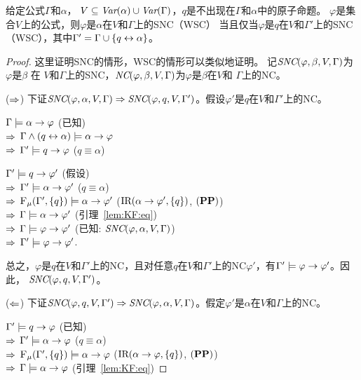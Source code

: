 \begin{proposition}\label{formulaNS_to_p}
	给定公式$\Gamma$和$\alpha$， $V \subseteq \textit{Var}(\alpha) \cup \textit{Var}(\Gamma)$，$q$是不出现在$\Gamma$和$\alpha$中的原子命题。
	$\varphi$是集合$V$上的公式，则$\varphi$是$\alpha$在$V$和$\Gamma$上的SNC（WSC） 当且仅当$\varphi$是$q$在$V$和$\Gamma'$上的SNC（WSC），其中$\Gamma' = \Gamma \cup \{q \leftrightarrow \alpha\}$。
\end{proposition}
\begin{proof}
	这里证明SNC的情形，WSC的情形可以类似地证明。
	记$\emph{SNC}(\varphi,\beta,V,\Gamma)$为$\varphi$是$\beta$ 在 $V$和$\Gamma$上的SNC，$\emph{NC}(\varphi,\beta,V,\Gamma)$为$\varphi$是$\beta$在$V$和 $\Gamma$上的NC。
	
	($\Rightarrow$) 下证$\emph{SNC}(\varphi,\alpha,V,\Gamma)\Rightarrow \emph{SNC}(\varphi,q,V,\Gamma')$。假设$\varphi'$是$q$在$V$和$\Gamma'$上的NC。
	
	$\Gamma \models \alpha \rightarrow \varphi$ \hfill  (已知)\\
	$\Rightarrow$ $\Gamma \wedge (q \leftrightarrow \alpha) \models \alpha \rightarrow \varphi$\\
	$\Rightarrow$ $\Gamma' \models q \rightarrow \varphi$  \hfill ($q \equiv \alpha$)
	
	$\Gamma' \models q \rightarrow \varphi'$ \hfill (假设) \\
	$\Rightarrow$ $\Gamma' \models \alpha \rightarrow \varphi'$ \hfill ($q \equiv \alpha$)\\
	$\Rightarrow$ ${\textsc{F}_{\textsc{$\mu$}}}(\Gamma', \{q\}) \models \alpha \rightarrow \varphi'$ \hfill ($\textrm{IR}(\alpha \rightarrow \varphi', \{q\})$, $(\textbf{PP})$)\\
	$\Rightarrow$ $\Gamma \models \alpha \rightarrow \varphi'$ \hfill  (引理~\ref{lem:KF:eq})\\
	$\Rightarrow$ $\Gamma \models \varphi \rightarrow \varphi'$ \hfill  (已知: $\emph{SNC}(\varphi,\alpha,V,\Gamma)$)\\
	$\Rightarrow$ $\Gamma' \models \varphi \rightarrow \varphi'$.
	
	总之，$\varphi$是$q$在$V$和$\Gamma'$上的NC，且对任意$q$在$V$和$\Gamma'$上的NC$\varphi'$，有$\Gamma' \models \varphi \rightarrow \varphi'$。因此， $\emph{SNC}(\varphi,q,V,\Gamma')$。
	
	($\Leftarrow$) 下证$\emph{SNC}(\varphi,q,V,\Gamma')\Rightarrow \emph{SNC}(\varphi,\alpha,V,\Gamma)$。假定$\varphi'$是$\alpha$在$V$和$\Gamma$上的NC。
	
	$\Gamma' \models q \rightarrow \varphi$ \hfill  (已知)\\
	$\Rightarrow$  $\Gamma' \models \alpha \rightarrow \varphi$ \hfill  ($q \equiv \alpha$)\\
	$\Rightarrow$  ${\textsc{F}_{\textsc{$\mu$}}}(\Gamma', \{q\}) \models \alpha \rightarrow \varphi$ \hfill ($\textrm{IR}(\alpha \rightarrow \varphi, \{q\})$, $(\textbf{PP})$)\\
	$\Rightarrow$ $\Gamma \models \alpha \rightarrow \varphi$ \hfill  (引理~\ref{lem:KF:eq})
	

\end{proof}
